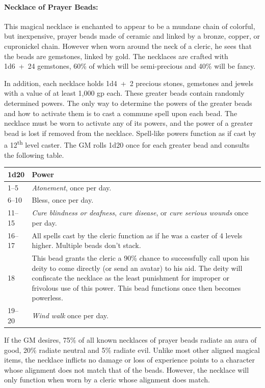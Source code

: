 \begin{multicols}{2}
\paragraph{Necklace of Prayer Beads:} This magical necklace is enchanted to appear to be a mundane chain of colorful, but inexpensive, prayer beads made of ceramic and linked by a bronze, copper, or cupronickel chain.  However when worn around the neck of a cleric, he sees that the beads are gemstones, linked by gold.  The necklaces are crafted with 1d6~+~24 gemstones, 60\% of which will be semi-precious and 40\% will be fancy.  

In addition, each necklace holds 1d4~+~2 precious stones, gemstones and jewels with a value of at least 1,000 gp each.  These greater beads contain randomly determined powers.  The only way to determine the powers of the greater beads and how to activate them is to cast a commune spell upon each bead.  The necklace must be worn to activate any of its powers, and the power of a greater bead is lost if removed from the necklace.  Spell-like powers function as if cast by a 12\textsuperscript{th}  level caster.  The GM rolls 1d20 once for each greater bead and consults the following table.

\noindent
\begin{tabular}{|p{}|p{}|}
\hline
1d20	& Power \\
\hline\hline
\rowcolor[gray]{.9}1--5	& \textit{Atonement}, once per day. \\
6--10	& Bless, once per day. \\
\rowcolor[gray]{.9}11--15	& \textit{Cure blindness or deafness}, \textit{cure disease}, or \textit{cure serious wounds} once per day. \\
16--17	& All spells cast by the cleric function as if he was a caster of 4 levels higher.  Multiple beads don't stack. \\
\rowcolor[gray]{.9}18	& This bead grants the cleric a 90\% chance to successfully call upon his deity to come directly (or send an avatar) to his aid.  The deity will confiscate the necklace as the least punishment for improper or frivolous use of this power.  This bead functions once then becomes powerless. \\
19--20	& \textit{Wind walk} once per day. \\
\hline
\end{tabular}

If the GM desires, 75\% of all known necklaces of prayer beads radiate an aura of good, 20\% radiate neutral and 5\% radiate evil.  Unlike most other aligned magical items, the necklace inflicts no damage or loss of experience points to a character whose alignment does not match that of the beads.  However, the necklace will only function when worn by a cleric whose alignment does match.

\end{multicols}

